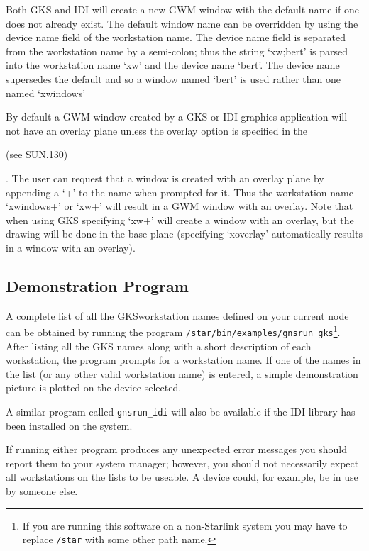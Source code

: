 Both GKS and IDI will create a new GWM window with the default name
if one does not already exist. The default window name can be overridden
by using the device name field of the workstation name. The device name
field is separated from the workstation name by a semi-colon; thus the
string `xw;bert' is parsed into the workstation name `xw' and the device
name `bert'. The device name supersedes the default and so a window
named `bert' is used rather than one named `xwindows'

By default a GWM window created by a GKS or IDI graphics application
will not have an overlay plane unless the overlay option is specified
in the 
\begin{latexonly}
(see SUN.130)
\end{latexonly}. 
The user can request that a window is created
with an overlay plane by appending a `+' to the name when prompted for
it. Thus the workstation name `xwindows+' or `xw+' will result in a
GWM window with an overlay. Note that when using GKS specifying `xw+'
will create a window with an overlay, but the drawing will be done in
the base plane (specifying `xoverlay' automatically results in a window
with an overlay).

\subsection{Demonstration Program}\label{demo-prog}

A complete list of all the GKSworkstation names defined on your current node can
be obtained by running the program 
{\tt /star/bin/examples/gnsrun\_gks}\footnote{If
you are running this software on a non-Starlink system you may have to 
replace {\tt /star} with some other path name.}. 
After listing all the GKS names along with a short description of each
workstation, the program prompts for a workstation name. If one of the names
in the list (or any other valid workstation name) is entered, a simple
demonstration picture is plotted on the device selected. 

A similar program called {\tt gnsrun\_idi} will also be available if the
IDI library has been installed on the system.

If running either program produces any unexpected error messages
you should report them to your system manager; however, you should not
necessarily expect all workstations on the lists to be useable. A device could,
for example, be in use by someone else.

